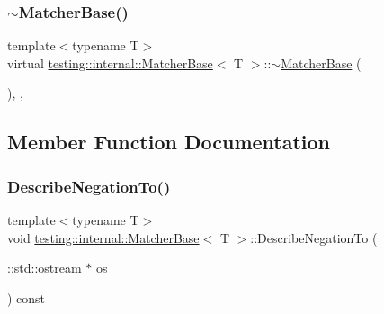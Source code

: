 \subsubsection{\texorpdfstring{$\sim$\+Matcher\+Base()}{~MatcherBase()}}
{\footnotesize\ttfamily template$<$typename T$>$ \\
virtual \hyperlink{classtesting_1_1internal_1_1_matcher_base}{testing\+::internal\+::\+Matcher\+Base}$<$ T $>$\+::$\sim$\hyperlink{classtesting_1_1internal_1_1_matcher_base}{Matcher\+Base} (\begin{DoxyParamCaption}{ }\end{DoxyParamCaption})\hspace{0.3cm}{\ttfamily [inline]}, {\ttfamily [protected]}, {\ttfamily [virtual]}}



\subsection{Member Function Documentation}
\mbox{\label{classtesting_1_1internal_1_1_matcher_base_ac1089d49b6b8a381900618985cd69b7f}} 
\subsubsection{\texorpdfstring{Describe\+Negation\+To()}{DescribeNegationTo()}}
{\footnotesize\ttfamily template$<$typename T$>$ \\
void \hyperlink{classtesting_1_1internal_1_1_matcher_base}{testing\+::internal\+::\+Matcher\+Base}$<$ T $>$\+::Describe\+Negation\+To (\begin{DoxyParamCaption}\item[{\+::std\+::ostream $\ast$}]{os }\end{DoxyParamCaption}) const\hspace{0.3cm}{\ttfamily [inline]}}

\mbox{\label{classtesting_1_1internal_1_1_matcher_base_a7e0c883c7745e0d646463077ef1c1267}} 
